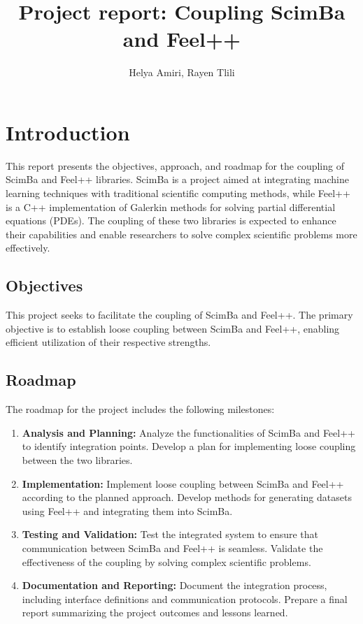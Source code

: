 \documentclass{article}
\title{Project report: Coupling ScimBa and Feel++}
\author{Helya Amiri, Rayen Tlili}
\date{}
\begin{document}
\maketitle

\tableofcontents
\newpage


\section{Introduction}

This report presents the objectives, approach, and roadmap for the coupling of ScimBa and Feel++ libraries. ScimBa is a project aimed at integrating machine learning techniques with traditional scientific computing methods, while Feel++ is a C++ implementation of Galerkin methods for solving partial differential equations (PDEs). The coupling of these two libraries is expected to enhance their capabilities and enable researchers to solve complex scientific problems more effectively.



\subsection{Objectives}

This project seeks to facilitate the coupling of ScimBa and Feel++.
The primary objective is to establish loose coupling between ScimBa and Feel++, enabling efficient utilization of their respective strengths.

\subsection{Roadmap}

The roadmap for the project includes the following milestones:

\begin{enumerate}
    \item \textbf{Analysis and Planning:} Analyze the functionalities of ScimBa and Feel++ to identify integration points. Develop a plan for implementing loose coupling between the two libraries.
    \item \textbf{Implementation:} Implement loose coupling between ScimBa and Feel++ according to the planned approach. Develop methods for generating datasets using Feel++ and integrating them into ScimBa.
    \item \textbf{Testing and Validation:} Test the integrated system to ensure that communication between ScimBa and Feel++ is seamless. Validate the effectiveness of the coupling by solving complex scientific problems.
    \item \textbf{Documentation and Reporting:} Document the integration process, including interface definitions and communication protocols. Prepare a final report summarizing the project outcomes and lessons learned.
\end{enumerate}
\end{document}
